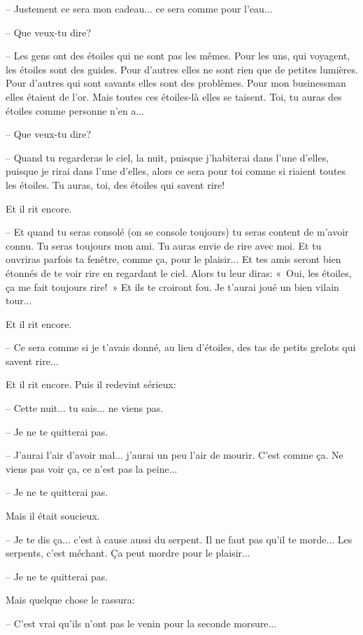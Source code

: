 \documentclass[a4paper]{report}
\begin{document}
-- Justement ce sera mon cadeau... ce sera comme pour l'eau...

-- Que veux-tu dire?

-- Les gens ont des étoiles qui ne sont pas les mêmes. Pour les uns, qui voyagent, les étoiles sont des guides. Pour d'autres elles ne sont rien que de petites lumières. Pour d'autres qui sont savants elles sont des problèmes. Pour mon businessman elles étaient de l'or. Mais toutes ces étoiles-là elles se taisent. Toi, tu auras des étoiles comme personne n'en a...

-- Que veux-tu dire?

-- Quand tu regarderas le ciel, la nuit, puisque j'habiterai dans l'une d'elles, puisque je rirai dans l'une d'elles, alors ce sera pour toi comme si riaient toutes les étoiles. Tu auras, toi, des étoiles qui savent rire!

Et il rit encore.

-- Et quand tu seras consolé (on se console toujours) tu seras content de m'avoir connu. Tu seras toujours mon ami. Tu auras envie de rire avec moi. Et tu ouvriras parfois ta fenêtre, comme ça, pour le plaisir... Et tes amis seront bien étonnés de te voir rire en regardant le ciel. Alors tu leur diras: «~Oui, les étoiles, ça me fait toujours rire!~» Et ils te croiront fou. Je t'aurai joué un bien vilain tour...

Et il rit encore.

-- Ce sera comme si je t'avais donné, au lieu d'étoiles, des tas de petits grelots qui savent rire...

Et il rit encore. Puis il redevint sérieux:

-- Cette nuit... tu sais... ne viens pas.

-- Je ne te quitterai pas.

-- J'aurai l'air d'avoir mal... j'aurai un peu l'air de mourir. C'est comme ça. Ne viens pas voir ça, ce n'est pas la peine...

-- Je ne te quitterai pas.

Mais il était soucieux.

-- Je te dis ça... c'est à cause aussi du serpent. Il ne faut pas qu'il te morde... Les serpents, c'est méchant. Ça peut mordre pour le plaisir...

-- Je ne te quitterai pas.

Mais quelque chose le rassura:

-- C'est vrai qu'ils n'ont pas le venin pour la seconde morsure...
\end{document}
